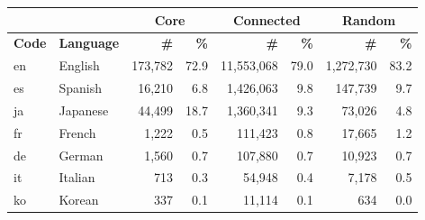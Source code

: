 \begin{tabular}{| l | l |  r | r | r | r | r | r |}
\hline
& & \multicolumn{2}{|c|}{\textbf{Core}} & \multicolumn{2}{|c|}{\textbf{Connected}} & \multicolumn{2}{|c|}{\textbf{Random}} \\ \hline
\textbf{Code} & \textbf{Language} & \textbf{\#} & \textbf{\%} & \textbf{\#} & \textbf{\%} & \textbf{\#} & \textbf{\%} \\ \hline
en & English & 173,782 & 72.9 & 11,553,068 & 79.0 & 1,272,730 & 83.2 \\ \hline
es & Spanish & 16,210 & 6.8 & 1,426,063 & 9.8 & 147,739 & 9.7 \\ \hline
ja & Japanese & 44,499 & 18.7 & 1,360,341 & 9.3 & 73,026 & 4.8 \\ \hline
fr & French & 1,222 & 0.5 & 111,423 & 0.8 & 17,665 & 1.2 \\ \hline
de & German & 1,560 & 0.7 & 107,880 & 0.7 & 10,923 & 0.7 \\ \hline
it & Italian & 713 & 0.3 & 54,948 &  0.4 & 7,178 & 0.5 \\ \hline
ko & Korean & 337 & 0.1 & 11,114 & 0.1 & 634 & 0.0 \\ \hline
\end{tabular}

